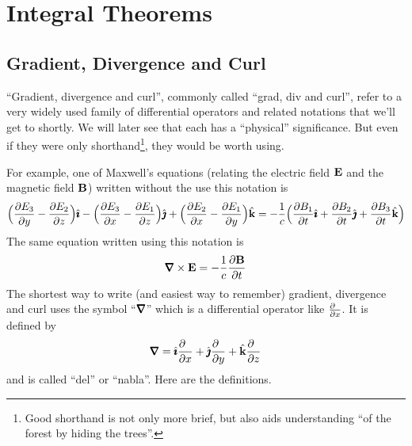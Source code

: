 \graphicspath{{figures/integral_theorems/}}
\chapter{Integral Theorems}\label{chap integral theorems}

\section{Gradient, Divergence and Curl}\label{sec:graadDivCurl}

``Gradient, divergence and curl'', commonly called ``grad, div and curl'',
 refer to a very widely used family of differential operators and related notations that we'll get to shortly. We will 
later see that each has a ``physical'' significance. But even if they
were only shorthand\footnote{Good shorthand is not only more brief,
but also aids understanding ``of the forest by hiding the trees''.}, 
they would be worth using.

For example,
one of Maxwell's equations (relating the electric field $\mathbf{E}$ and
the magnetic field $\mathbf{B}$) written without the use this notation is
\begin{align*}
\Big(\frac{\partial E_3}{\partial y} -\frac{\partial E_2}{\partial z}\Big)\hat{\pmb{\imath}}
-\Big(\frac{\partial E_3}{\partial x} -\frac{\partial E_1}{\partial z}\Big)\hat{\pmb{\jmath}}
+\Big(\frac{\partial E_2}{\partial x} -\frac{\partial E_1}{\partial y}\Big)\hat{\mathbf{k}}
=-\frac{1}{c}\Big(\frac{\partial B_1}{\partial t} \hat{\pmb{\imath}}
+\frac{\partial B_2}{\partial t} \hat{\pmb{\jmath}}
+\frac{\partial B_3}{\partial t} \hat{\mathbf{k}}\Big)
\end{align*}
The same equation written using this notation is
\begin{equation*}
\vnabla\times\vE = -\frac{1}{c}\frac{\partial \vB}{\partial t}
\end{equation*}
The shortest way to write (and  easiest way to remember) gradient,
divergence and curl uses the symbol ``$\vnabla$'' which is a differential
operator like $\frac{\partial\hfill}{\partial x}$. It is defined by
\begin{equation*}
\vnabla = \hi\frac{\partial\hfill}{\partial x}
          +\hj\frac{\partial\hfill}{\partial y}
          +\hk\frac{\partial\hfill}{\partial z}
\end{equation*}
and is called ``del'' or ``nabla''.  Here are the definitions.

